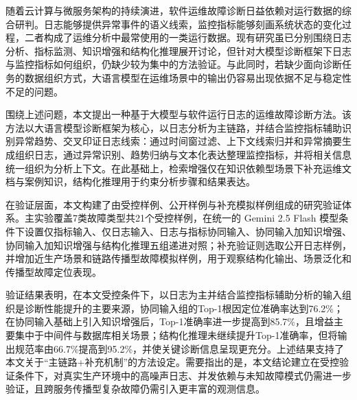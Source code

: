 
随着云计算与微服务架构的持续演进，软件运维故障诊断日益依赖对运行数据的综合研判。日志能够提供异常事件的语义线索，监控指标能够刻画系统状态的变化过程，二者构成了运维分析中最常使用的一类运行数据。现有研究虽已分别围绕日志分析、指标监测、知识增强和结构化推理展开讨论，但针对大模型诊断框架下日志与监控指标如何组织，仍缺少较为集中的方法验证。与此同时，若缺少面向诊断任务的数据组织方式，大语言模型在运维场景中的输出仍容易出现依据不足与稳定性不足的问题。

围绕上述问题，本文提出一种基于大模型与软件运行日志的运维故障诊断方法。该方法以大语言模型诊断框架为核心，以日志分析为主链路，并结合监控指标辅助识别异常趋势、交叉印证日志线索：通过时间窗过滤、上下文线索归并和异常摘要生成组织日志，通过异常识别、趋势归纳与文本化表达整理监控指标，并将相关信息统一组织为分析上下文。在此基础上，检索增强仅在知识依赖型场景下补充运维文档与案例知识，结构化推理用于约束分析步骤和结果表达。

在验证层面，本文构建了由受控样例、公开样例与补充模拟样例组成的研究验证体系。主实验覆盖7类故障类型共21个受控样例，在统一的 Gemini 2.5 Flash 模型条件下设置仅指标输入、仅日志输入、日志与指标协同输入、协同输入加知识增强、协同输入加知识增强与结构化推理五组递进对照；补充验证则选取公开日志样例，并增加近生产场景和链路传播型故障模拟样例，用于观察结构化输出、场景泛化和传播型故障定位表现。

验证结果表明，在本文受控条件下，以日志为主并结合监控指标辅助分析的输入组织是诊断性能提升的主要来源，协同输入组的Top-1根因定位准确率达到76.2\%；在协同输入基础上引入知识增强后，Top-1准确率进一步提高到85.7\%，且增益主要集中于中间件与数据库相关场景；结构化推理未继续提升Top-1准确率，但将输出规范率由66.7\%提高到95.2\%，并使关键诊断信息呈现更充分。上述结果支持了本文关于“主链路+补充机制”的方法设定。需要指出的是，本文结论建立在受控验证条件下，对真实生产环境中的高噪声日志、并发依赖与未知故障模式仍需进一步验证，且跨服务传播型复杂故障仍需引入更丰富的观测信息。
